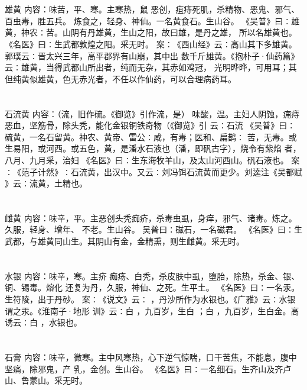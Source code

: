 \documentclass[12pt,UTF8]{ctexbook}
\begin{document}
\chapter{}雄黄
内容：味苦，平、寒。主寒热，鼠 恶创，疽痔死肌，杀精物、恶鬼、邪气、百虫毒，胜五兵。 
炼食之，轻身、神仙。一名黄食石。生山谷。 
《吴普》曰∶雄黄，神农∶苦。山阴有丹雄黄，生山之阳，故曰雄，是丹之雄， 
所以名雄黄也。 
《名医》曰∶生武都敦煌之阳。采无时。 
案∶《西山经》云∶高山其下多雄黄。郭璞云∶晋太兴三年，高平郡界有山崩，其中出 
数千斤雄黄。《抱朴子·仙药篇》云∶雄黄，当得武都山所出者，纯而无杂，其赤如鸡冠， 
光明晔晔，可用耳；其但纯黄似雄黄，色无赤光者，不任以作仙药，可以合理病药耳。 


\chapter{}石流黄
内容：（流，旧作硫。《御览》引作流，是） 
味酸，温。主妇人阴蚀，痈痔恶血，坚筋骨，除头秃，能化金银铜铁奇物（《御览》引 
云∶石流 
《吴普》曰∶硫黄，一名石留黄。神农、黄帝、雷公∶咸，有毒；医和、扁鹊∶ 
苦，无毒。或生易阳，或河西。或五色，黄，是潘水石液也（潘，即矾古字），烧令有紫焰 
者， 
八月、九月采，治妇 
《名医》曰∶生东海牧羊山，及太山河西山。矾石液也。 
案∶《范子计然》∶石流黄，出汉中。又云∶刘冯饵石流黄而更少。刘逵注《吴都赋 
》云∶流黄，土精也。 


\chapter{}雌黄
内容：味辛，平。主恶创头秃痂疥，杀毒虫虱，身痒，邪气、诸毒。炼之。久服，轻身、增年、 
不老。生山谷。 
吴普曰∶磁石，一名磁君。 
《名医》曰∶生武都，与雄黄同山生。其阴山有金，金精熏，则生雌黄。采无时。 


\chapter{}水银
内容：味辛，寒。主疥 痂疡、白秃，杀皮肤中虱，堕胎，除热，杀金、银、铜、锡毒。熔化 
还复为丹，久服，神仙、之死。生平土。 
《名医》曰∶一名汞。生符陵，出于丹砂。 
案∶《说文》云∶ ，丹沙所作为水银也。《广雅》云∶水银谓之汞。《淮南子·地形 
训》云∶白 ，九百岁，生白 ；白 ，九百岁，生白金。高诱云∶白 ，水银也。 


\chapter{}石膏
内容：味辛，微寒。主中风寒热，心下逆气惊喘，口干苦焦，不能息，腹中坚痛，除邪鬼，产 
乳，金创。生山谷。 
《名医》曰∶一名细石。生齐山及齐卢山、鲁蒙山。采无时。 
\end{document}
